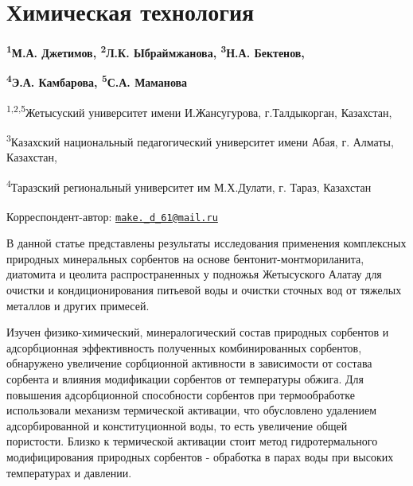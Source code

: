 \let\cleardoublepage\clearpage
\chapter{Химическая технология}

\begin{articleheader}

{\bfseries \textsuperscript{1}М.А. Джетимов\textsuperscript{\envelope },
\textsuperscript{2}Л.К. Ыбраймжанова, \textsuperscript{3}Н.А. Бектенов,}

{\bfseries \textsuperscript{4}Э.А. Камбарова, \textsuperscript{5}С.А.
Маманова}
\end{articleheader}

\begin{affiliation}
\textsuperscript{1,2,5}Жетысуский университет имени И.Жансугурова,
г.Талдыкорган, Казахстан,

\textsuperscript{3}Казахский национальный педагогический университет
имени Абая, г. Алматы, Казахстан,

\textsuperscript{4}Таразский региональный университет им М.Х.Дулати, г.
Тараз, Казахстан

\raggedright {\bfseries \textsuperscript{\envelope }}Корреспондент-автор: \href{mailto:make._d_61@mail.ru}{\nolinkurl{make.\_d\_61@mail.ru}}
\end{affiliation}

В данной статье представлены результаты исследования применения
комплексных природных минеральных сорбентов на основе
бентонит-монтмориланита, диатомита и цеолита распространенных у подножья
Жетысуского Алатау для очистки и кондиционирования питьевой воды и
очистки сточных вод от тяжелых металлов и других примесей.

Изучен физико-химический, минералогический состав природных сорбентов и
адсорбционная эффективность полученных комбинированных сорбентов,
обнаружено увеличение сорбционной активности в зависимости от состава
сорбента и влияния модификации сорбентов от температуры обжига. Для
повышения адсорбционной способности сорбентов при термообработке
использовали механизм термической активации, что обусловлено удалением
адсорбированной и конституционной воды, то есть увеличение общей
пористости. Близко к термической активации стоит метод гидротермального
модифицирования природных сорбентов - обработка в парах воды при высоких
температурах и давлении.

